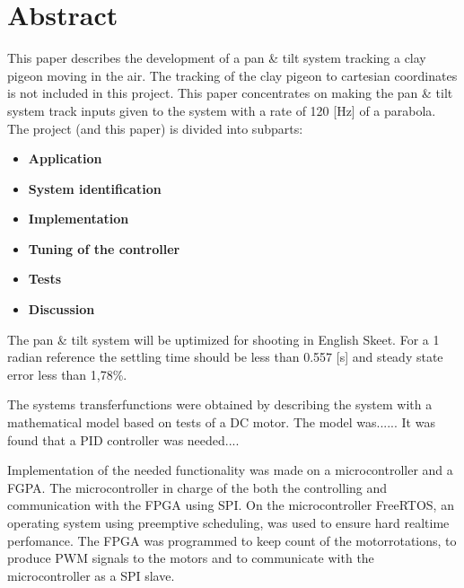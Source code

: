 
\setcounter{page}{1}
\section*{Abstract}

This paper describes the development of a pan \& tilt system tracking a clay 
pigeon moving in the air. 
The tracking of the clay pigeon to cartesian coordinates is not included in this 
project. This paper concentrates on making the pan \& tilt system track inputs 
given to the system with a rate of 120 [Hz] of a parabola.
The project (and this paper) is divided into subparts: 
 
\begin{itemize}
  \item \textbf{Application}
  \item \textbf{System identification} 
  \item \textbf{Implementation}
  \item \textbf{Tuning of the controller} 
  \item \textbf{Tests} 
  \item \textbf{Discussion} 
\end{itemize}

The pan \& tilt system will be uptimized for shooting in English Skeet. For a 1 
radian reference the settling time should be less than 0.557 [s] and steady 
state error less than 1,78\%.

The systems transferfunctions were obtained by describing the system with a 
mathematical model based on tests of a DC motor. The model was...... It was 
found that a PID controller was needed....

Implementation of the needed functionality was made on a microcontroller and a 
FGPA. The microcontroller in charge of the both the controlling and 
communication with the FPGA using SPI. 
On the microcontroller FreeRTOS, an operating system using preemptive scheduling, was used 
to ensure hard realtime perfomance.
The FPGA was programmed to keep count of the motorrotations, to produce PWM 
signals to the motors and to communicate with the microcontroller as a SPI slave.

